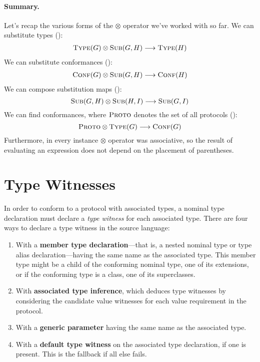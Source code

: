 \documentclass[../generics]{subfiles}
\begin{document}
\paragraph{Summary.}
Let's recap the various forms of the \index{$\otimes$}$\otimes$ operator we've worked with so far. We can substitute types ():
\begin{gather*}
\textsc{Type}({G})\otimes\textsc{Sub}({G, H})\longrightarrow\textsc{Type}({H})
\end{gather*}
We can substitute conformances ():
\begin{gather*}
\textsc{Conf}({G})\otimes\textsc{Sub}({G, H})\longrightarrow\textsc{Conf}({H})
\end{gather*}
We can compose substitution maps ():
\[\textsc{Sub}({G, H})\otimes\textsc{Sub}({H, I})\longrightarrow\textsc{Sub}({G, I})\]
We can find conformances, where $\textsc{Proto}$ denotes the set of all protocols ():
\[\textsc{Proto} \otimes \textsc{Type}({G}) \longrightarrow \textsc{Conf}({G})\]
Furthermore, in every instance $\otimes$ operator was associative, so the result of evaluating an expression does not depend on the placement of parentheses.

\section{Type Witnesses}\label{type witnesses}

In order to conform to a protocol with associated types, a nominal type declaration must declare a \emph{type witness} for each associated type. There are four ways to declare a type witness in the source language:
\begin{enumerate}
\item With a \textbf{member type declaration}---that is, a nested nominal type or type alias declaration---having the same name as the associated type. This member type might be a child of the conforming nominal type, one of its extensions, or if the conforming type is a class, one of its superclasses.
\item With \textbf{associated type inference}, which deduces type witnesses by considering the candidate value witnesses for each value requirement in the protocol.
\item With a \textbf{generic parameter} having the same name as the associated type.
\item With a \textbf{default type witness} on the associated type declaration, if one is present. This is the fallback if all else fails.
\end{enumerate}
\end{document}
